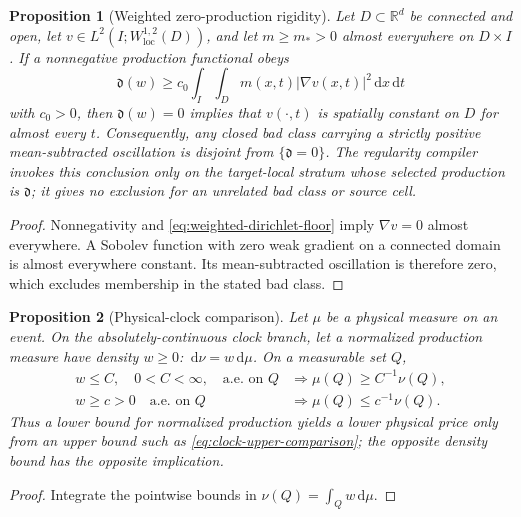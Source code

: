 \documentclass[11pt]{article}
\numberwithin{section}{part}
\theoremstyle{plain}
\newtheorem{proposition}[proposition]{Proposition}
\theoremstyle{definition}
\theoremstyle{remark}
\newcommand{\dd}{\,\mathrm d}
\begin{document}
\begin{proposition}[Weighted zero-production rigidity]
\label{prop:weighted-zero-production-rigidity}
Let \(D\subset\mathbb R^d\) be connected and open, let
\(v\in L^2(I;W^{1,2}_{\mathrm{loc}}(D))\), and let
\(m\ge m_*>0\) almost everywhere on \(D\times I\).  If a nonnegative
production functional obeys
\begin{equation}
 \label{eq:weighted-dirichlet-floor}
 \mathfrak d(w)
 \ge c_0\int_I\int_Dm(x,t)|\nabla v(x,t)|^2\dd x\dd t
\end{equation}
with \(c_0>0\), then \(\mathfrak d(w)=0\) implies that
\(v(\cdot,t)\) is spatially constant on \(D\) for almost every \(t\).
Consequently, any closed bad class carrying a strictly positive
mean-subtracted oscillation is disjoint from \(\{\mathfrak d=0\}\).  The
regularity compiler invokes this conclusion only on the target-local stratum
whose selected production is \(\mathfrak d\); it gives no exclusion for an
unrelated bad class or source cell.
\end{proposition}

\begin{proof}
Nonnegativity and \eqref{eq:weighted-dirichlet-floor} imply
\(\nabla v=0\) almost everywhere.  A Sobolev function with zero weak gradient
on a connected domain is almost everywhere constant.  Its mean-subtracted
oscillation is therefore zero, which excludes membership in the stated bad
class.
\end{proof}

\begin{proposition}[Physical-clock comparison]
\label{prop:physical-clock-comparison}
Let \(\mu\) be a physical measure on an event.  On the absolutely-continuous
clock branch, let a normalized production measure have density \(w\ge0\):
\(\dd\nu=w\dd\mu\).  On a measurable set \(Q\),
\begin{align}
 w\le C,\quad 0<C<\infty,\quad\text{a.e. on }Q
 &\Longrightarrow \mu(Q)\ge C^{-1}\nu(Q),
 \label{eq:clock-upper-comparison}\\
 w\ge c>0\quad\text{a.e. on }Q
 &\Longrightarrow \mu(Q)\le c^{-1}\nu(Q).
 \label{eq:clock-lower-comparison}
\end{align}
Thus a lower bound for normalized production yields a lower physical price
only from an upper bound such as \eqref{eq:clock-upper-comparison}; the
opposite density bound has the opposite implication.
\end{proposition}

\begin{proof}
Integrate the pointwise bounds in \(\nu(Q)=\int_Qw\dd\mu\).
\end{proof}
\end{document}
